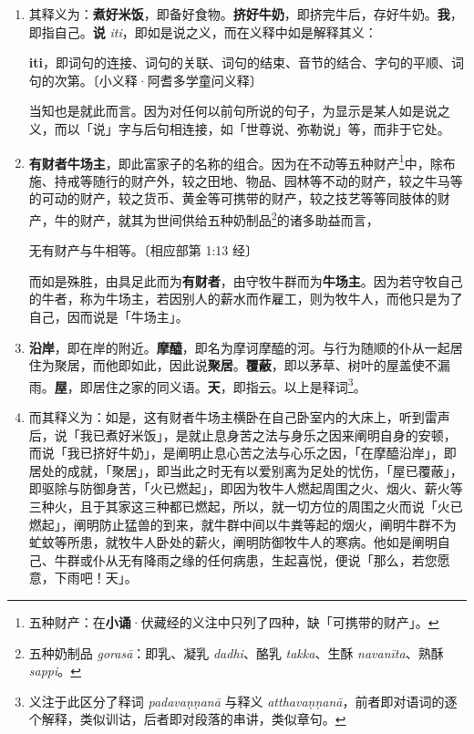 \begin{enumerate}
\item 其释义为：\textbf{煮好米饭}，即备好食物。\textbf{挤好牛奶}，即挤完牛后，存好牛奶。\textbf{我}，即指自己。\textbf{说} \textit{iti}，即如是说之义，而在义释中如是解释其义：\begin{quoting}\textbf{iti}，即词句的连接、词句的关联、词句的结束、音节的结合、字句的平顺、词句的次第。{\bluefootnotesize 〔小义释·阿耆多学童问义释〕}\end{quoting}当知也是就此而言。因为对任何以前句所说的句子，为显示是某人如是说之义，而以「说」字与后句相连接，如「世尊说、弥勒说」等，而非于它处。
\item \textbf{有财者牛场主}，即此富家子的名称的组合。因为在不动等五种财产\footnote{五种财产：在\textbf{小诵}·伏藏经的义注中只列了四种，缺「可携带的财产」。}中，除布施、持戒等随行的财产外，较之田地、物品、园林等不动的财产，较之牛马等的可动的财产，较之货币、黄金等可携带的财产，较之技艺等等同肢体的财产，牛的财产，就其为世间供给五种奶制品\footnote{五种奶制品 \textit{gorasā}：即乳、凝乳 \textit{dadhi}、酪乳 \textit{takka}、生酥 \textit{navanīta}、熟酥 \textit{sappi}。}的诸多助益而言，\begin{quoting}无有财产与牛相等。{\bluefootnotesize 〔相应部第 1:13 经〕}\end{quoting}而如是殊胜，由具足此而为\textbf{有财者}，由守牧牛群而为\textbf{牛场主}。因为若守牧自己的牛者，称为牛场主，若因别人的薪水而作雇工，则为牧牛人，而他只是为了自己，因而说是「牛场主」。
\item \textbf{沿岸}，即在岸的附近。\textbf{摩醯}，即名为摩诃摩醯的河。与行为随顺的仆从一起居住为聚居，而他即如此，因此说\textbf{聚居}。\textbf{覆蔽}，即以茅草、树叶的屋盖使不漏雨。\textbf{屋}，即居住之家的同义语。\textbf{天}，即指云。以上是释词\footnote{义注于此区分了释词 \textit{padavaṇṇanā} 与释义 \textit{atthavaṇṇanā}，前者即对语词的逐个解释，类似训诂，后者即对段落的串讲，类似章句。}。
\item 而其释义为：如是，这有财者牛场主横卧在自己卧室内的大床上，听到雷声后，说「我已煮好米饭」，是就止息身苦之法与身乐之因来阐明自身的安顿，而说「我已挤好牛奶」，是阐明止息心苦之法与心乐之因，「在摩醯沿岸」，即居处的成就，「聚居」，即当此之时无有以爱别离为足处的忧伤，「屋已覆蔽」，即驱除与防御身苦，「火已燃起」，即因为牧牛人燃起周围之火、烟火、薪火等三种火，且于其家这三种都已燃起，所以，就一切方位的周围之火而说「火已燃起」，阐明防止猛兽的到来，就牛群中间以牛粪等起的烟火，阐明牛群不为虻蚊等所患，就牧牛人卧处的薪火，阐明防御牧牛人的寒病。他如是阐明自己、牛群或仆从无有降雨之缘的任何病患，生起喜悦，便说「那么，若您愿意，下雨吧！天」。\end{enumerate}

